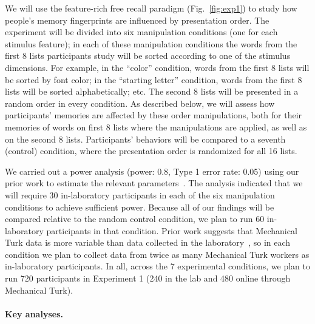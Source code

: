 We will use the feature-rich free recall paradigm (Fig.~\ref{fig:exp1}) to
study how people's memory fingerprints are influenced by presentation order.
The experiment will be divided into six manipulation conditions (one for each
stimulus feature); in each of these manipulation conditions the words from the
first 8 lists participants study will be sorted according to one of the
stimulus dimensions. For example, in the ``color'' condition, words from the
first 8 lists will be sorted by font color; in the ``starting letter''
condition, words from the first 8 lists will be sorted alphabetically; etc. The
second 8 lists will be presented in a random order in every condition. As
described below, we will assess how participants' memories are affected by
these order manipulations, both for their memories of words on first 8 lists
where the manipulations are applied, as well as on the second 8 lists.
Participants' behaviors will be compared to a seventh (control) condition,
where the presentation order is randomized for all 16 lists.

We carried out a power analysis (power: 0.8, Type 1 error rate: 0.05) using our
prior work to estimate the relevant parameters~\citep{MannEtal11, MannEtal12}.
The analysis indicated that we will require 30 in-laboratory participants in
each of the six manipulation conditions to achieve sufficient power. Because
all of our findings will be compared relative to the random control condition,
we plan to run 60 in-laboratory participants in that condition. Prior work
suggests that Mechanical Turk data is more variable than data collected in the
laboratory~\citep{CrumEtal13}, so in each condition we plan to collect data
from twice as many Mechanical Turk workers as in-laboratory participants. In
all, across the 7 experimental conditions, we plan to run 720 participants in
Experiment 1 (240 in the lab and 480 online through Mechanical Turk).

\paragraph{Key analyses.}

